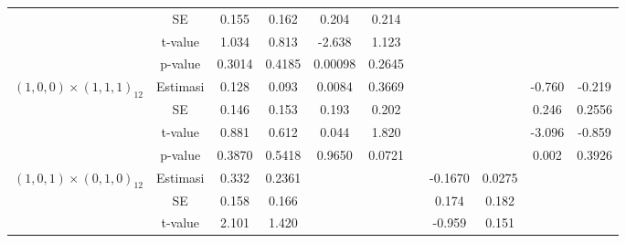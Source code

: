 \begin{enumerate}[label=\alph*.]
\begin{longtable}{|c|c|c|c|c|c|c|c|c|c|c|}
            & SE
            & {0.155} & {0.162}
            & {0.204} & {0.214} & {}
            & {} & {}
            & {} & {} \\ \cline{2-11}

            & t-value
            & {1.034} & {0.813}
            & {-2.638} & {1.123} & {}
            & {} & {}
            & {} & {} \\ \cline{2-11}

            & p-value
            & {0.3014} & {0.4185}
            & {0.00098} & {0.2645} & {}
            & {} & {}
            & {} & {} \\ \hline

            \multirow{4}{*}{$(1,0,0)\times(1,1,1)_{12}$}
            & Estimasi
            & {0.128} & {0.093}
            & {0.0084} & {0.3669} & {}
            & {} & {}
            & {-0.760} & {-0.219} \\ \cline{2-11}

            & SE
            & {0.146} & {0.153}
            & {0.193} & {0.202} & {}
            & {} & {}
            & {0.246} & {0.2556} \\ \cline{2-11}

            & t-value
            & {0.881} & {0.612}
            & {0.044} & {1.820} & {}
            & {} & {}
            & {-3.096} & {-0.859} \\ \cline{2-11}

            & p-value
            & {0.3870} & {0.5418}
            & {0.9650} & {0.0721} & {}
            & {} & {}
            & {0.002} & {0.3926} \\ \hline

            \multirow{4}{*}{$(1,0,1)\times(0,1,0)_{12}$}
            & Estimasi
            & {0.332} & {0.2361}
            & {} & {} & {}
            & {-0.1670} & {0.0275}
            & {} & {} \\ \cline{2-11}

            & SE
            & {0.158} & {0.166}
            & {} & {} & {}
            & {0.174} & {0.182}
            & {} & {} \\ \cline{2-11}

            & t-value
            & {2.101} & {1.420}
            & {} & {} & {}
            & {-0.959} & {0.151}
            & {} & {} \\ \cline{2-11}


\end{longtable}
\end{enumerate}
